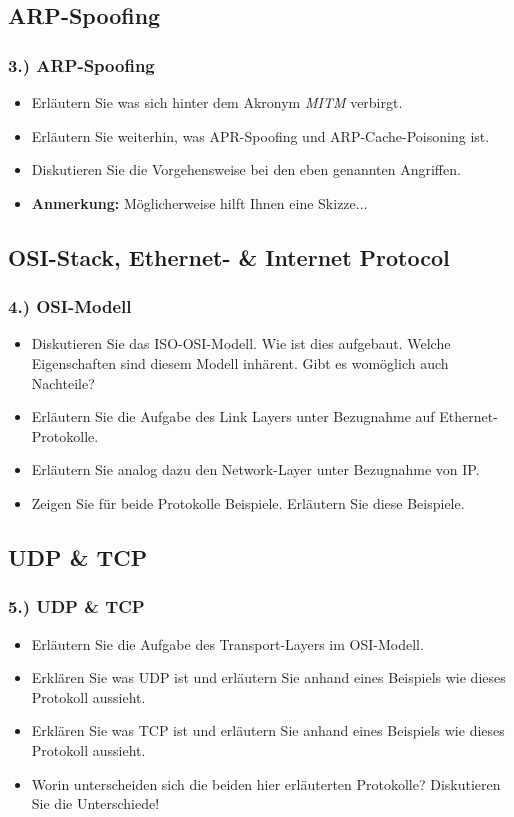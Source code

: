 \documentclass[xcolor=dvipsnames, aspectratio=169]{beamer}
\begin{document}
\subsection{ARP-Spoofing}
\begin{frame}
\frametitle{3.) ARP-Spoofing}
	\begin{itemize}
		\item Erläutern Sie was sich hinter dem Akronym \emph{MITM} verbirgt.
		\item Erläutern Sie weiterhin, was APR-Spoofing und ARP-Cache-Poisoning ist.
		\item Diskutieren Sie die Vorgehensweise bei den eben genannten Angriffen. 
		\item \textbf{Anmerkung:} Möglicherweise hilft Ihnen eine Skizze...
	\end{itemize}
\end{frame}

\subsection{OSI-Stack, Ethernet- \& Internet Protocol}
\begin{frame}
	\frametitle{4.) OSI-Modell}
	\begin{itemize}
		\item Diskutieren Sie das ISO-OSI-Modell. Wie ist dies aufgebaut. Welche Eigenschaften sind diesem Modell inhärent. Gibt es womöglich auch Nachteile?
		\item Erläutern Sie die Aufgabe des Link Layers unter Bezugnahme auf Ethernet-Protokolle. 
		\item Erläutern Sie analog dazu den Network-Layer unter Bezugnahme von IP.
		\item Zeigen Sie für beide Protokolle Beispiele. Erläutern Sie diese Beispiele.
	\end{itemize}
\end{frame}

\subsection{UDP \& TCP}
\begin{frame}
\frametitle{5.) UDP \& TCP}
	\begin{itemize}
		\item Erläutern Sie die Aufgabe des Transport-Layers im OSI-Modell.
		\item Erklären Sie was UDP ist und erläutern Sie anhand eines Beispiels wie dieses Protokoll aussieht.
		\item Erklären Sie was TCP ist und erläutern Sie anhand eines Beispiels wie dieses Protokoll aussieht.
		\item Worin unterscheiden sich die beiden hier erläuterten Protokolle? Diskutieren Sie die Unterschiede!
	\end{itemize}
\end{frame}
\end{document}

